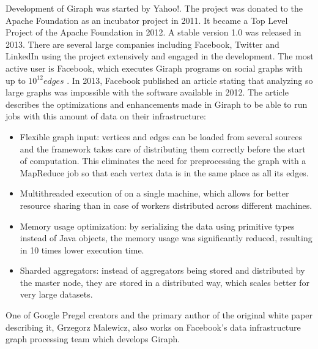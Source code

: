 \documentclass{pracamgr}
\theoremstyle{plain}
\theoremstyle{definition}
\theoremstyle{remark}
\begin{document}
Development of Giraph was started by Yahoo!. The project was donated to the Apache Foundation as an incubator project in 2011. It became a Top Level Project of the Apache Foundation in 2012. A stable version 1.0 was released in 2013. There are several large companies including Facebook, Twitter and LinkedIn using the project extensively and engaged in the development. The most active user is Facebook, which executes Giraph programs on social graphs with up to $10^12 edges$ \cite{giraphfb}. In 2013, Facebook published an article \cite{giraphfb} stating that analyzing so large graphs was impossible with the software available in 2012. The article describes the optimizations and enhancements made in Giraph to be able to run jobs with this amount of data on their infrastructure:
\begin{itemize}
\item Flexible graph input: vertices and edges can be loaded from several sources and the framework takes care of distributing them correctly before the start of computation. This eliminates the need for preprocessing the graph with a MapReduce job so that each vertex data is in the same place as all its edges.
\item Multithreaded execution of on a single machine, which allows for better resource sharing than in case of workers distributed across different machines.
\item Memory usage optimization: by serializing the data using primitive types instead of Java objects, the memory usage was significantly reduced, resulting in 10 times lower execution time.
\item Sharded aggregators: instead of aggregators being stored and distributed by the master node, they are stored in a distributed way, which scales better for very large datasets.
\end{itemize}
One of Google Pregel creators and the primary author of the original white paper describing it, Grzegorz Malewicz, also works on Facebook's data infrastructure graph processing team which develops Giraph.
\end{document}
